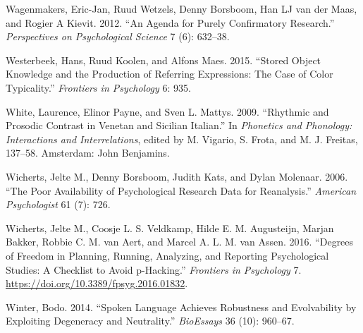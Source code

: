 \documentclass[
  12pt,
]{article}
\newlength{\cslhangindent}
\newenvironment{CSLReferences}[2] %
 {%
  \setlength{\parindent}{0pt}
  \ifodd #1 \everypar{\setlength{\hangindent}{\cslhangindent}}\ignorespaces\fi
  \ifnum #2 > 0
  \setlength{\parskip}{#2\baselineskip}
  \fi
 }%
 {}
\begin{document}
\begin{CSLReferences}{1}{0}
\leavevmode{}%
Wagenmakers, Eric-Jan, Ruud Wetzels, Denny Borsboom, Han LJ van der Maas, and Rogier A Kievit. 2012. {``An Agenda for Purely Confirmatory Research.''} \emph{Perspectives on Psychological Science} 7 (6): 632--38.

\leavevmode{}%
Westerbeek, Hans, Ruud Koolen, and Alfons Maes. 2015. {``Stored Object Knowledge and the Production of Referring Expressions: The Case of Color Typicality.''} \emph{Frontiers in Psychology} 6: 935.

\leavevmode{}%
White, Laurence, Elinor Payne, and Sven L. Mattys. 2009. {``Rhythmic and Prosodic Contrast in {V}enetan and {S}icilian {I}talian.''} In \emph{Phonetics and Phonology: Interactions and Interrelations}, edited by M. Vigario, S. Frota, and M. J. Freitas, 137--58. Amsterdam: John Benjamins.

\leavevmode{}%
Wicherts, Jelte M., Denny Borsboom, Judith Kats, and Dylan Molenaar. 2006. {``The Poor Availability of Psychological Research Data for Reanalysis.''} \emph{American Psychologist} 61 (7): 726.

\leavevmode{}%
Wicherts, Jelte M., Coosje L. S. Veldkamp, Hilde E. M. Augusteijn, Marjan Bakker, Robbie C. M. van Aert, and Marcel A. L. M. van Assen. 2016. {``Degrees of Freedom in Planning, Running, Analyzing, and Reporting Psychological Studies: A Checklist to Avoid p-Hacking.''} \emph{Frontiers in Psychology} 7. \url{https://doi.org/10.3389/fpsyg.2016.01832}.

\leavevmode{}%
Winter, Bodo. 2014. {``Spoken Language Achieves Robustness and Evolvability by Exploiting Degeneracy and Neutrality.''} \emph{BioEssays} 36 (10): 960--67.

\end{CSLReferences}

\endgroup
\end{document}
